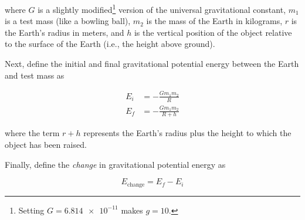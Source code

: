 \documentclass[../main-physics-problems.tex]{subfiles}
\begin{document}
\begin{questions}
where $G$ is a slightly modified\footnote{Setting $G = \num{6.814e-11}$ makes $g = 10$.} version of the universal gravitational constant, $m_1$ is a test mass (like a bowling ball), $m_2$ is the mass of the Earth in kilograms, $r$ is the Earth's radius in meters, and $h$ is the vertical position of the object relative to the surface of the Earth (i.e., the height above ground). 

Next, define the initial and final gravitational potential energy between the Earth and test mass as

\begin{align*}
    E_i &= -\frac{G m_1 m_2}{R} \\[1ex]
    E_f &= - \frac{G m_1 m_2}{R+h}
\end{align*}

where the term $r+h$ represents the Earth's radius plus the height to which the object has been raised.

Finally, define the \textit{change} in gravitational potential energy as

\begin{equation*}
    E_{\mathrm{change}} = E_f - E_i
\end{equation*}

\end{questions}
\end{document}
